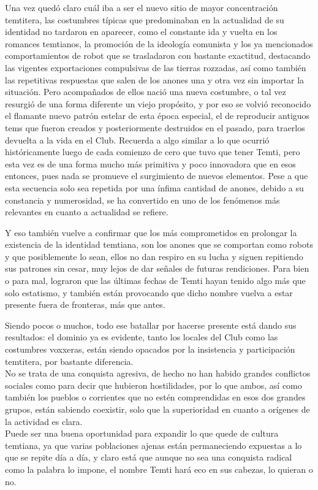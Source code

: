 \documentclass[
  spanish,
]{book}
\begin{document}
Una vez quedó claro cuál iba a ser el nuevo sitio de mayor concentración temtitera, las costumbres típicas que predominaban en la actualidad de su identidad no tardaron en aparecer, como el constante ida y vuelta en los romances temtianos, la promoción de la ideología comunista y los ya mencionados comportamientos de robot que se trasladaron con bastante exactitud, destacando las vigentes exportaciones compulsivas de las tierras rozzadas, así como también las repetitivas respuestas que salen de los anones una y otra vez sin importar la situación.
Pero acompañados de ellos nació una nueva costumbre, o tal vez resurgió de una forma diferente un viejo propósito, y por eso se volvió reconocido el flamante nuevo patrón estelar de esta época especial, el de reproducir antiguos tems que fueron creados y posteriormente destruidos en el pasado, para traerlos devuelta a la vida en el Club. Recuerda a algo similar a lo que ocurrió históricamente luego de cada comienzo de cero que tuvo que tener Temti, pero esta vez es de una forma mucho más primitiva y poco innovadora que en esos entonces, pues nada se promueve el surgimiento de nuevos elementos. Pese a que esta secuencia solo sea repetida por una ínfima cantidad de anones, debido a su constancia y numerosidad, se ha convertido en uno de los fenómenos más relevantes en cuanto a actualidad se refiere.

Y eso también vuelve a confirmar que los más comprometidos en prolongar la existencia de la identidad temtiana, son los anones que se comportan como robots y que posiblemente lo sean, ellos no dan respiro en su lucha y siguen repitiendo sus patrones sin cesar, muy lejos de dar señales de futuras rendiciones. Para bien o para mal, lograron que las últimas fechas de Temti hayan tenido algo más que solo estatismo, y también están provocando que dicho nombre vuelva a estar presente fuera de fronteras, más que antes.

Siendo pocos o muchos, todo ese batallar por hacerse presente está dando sus resultados: el dominio ya es evidente, tanto los locales del Club como las costumbres voxxeras, están siendo opacados por la insistencia y participación temtitera, por bastante diferencia.\\
No se trata de una conquista agresiva, de hecho no han habido grandes conflictos sociales como para decir que hubieron hostilidades, por lo que ambos, así como también los pueblos o corrientes que no estén comprendidas en esos dos grandes grupos, están sabiendo coexistir, solo que la superioridad en cuanto a orígenes de la actividad es clara.\\
Puede ser una buena oportunidad para expandir lo que quede de cultura temtiana, ya que varias poblaciones ajenas están permaneciendo expuestas a lo que se repite día a día, y claro está que aunque no sea una conquista radical como la palabra lo impone, el nombre Temti hará eco en sus cabezas, lo quieran o no.
\end{document}
